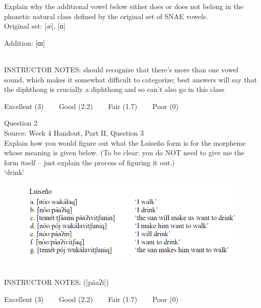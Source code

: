 \documentclass[12pt]{article}
\begin{document}
Explain why the additional vowel below either does or does not belong in the phonetic natural class defined by the original set of SNAE vowels.\\

Original set: {[æ]}, {[ɑ]}

Addition: {[ɑɪ]}


~\\
INSTRUCTOR NOTES: should recognize that there's more than one vowel sound, which makes it somewhat difficult to categorize; best answers will say that the diphthong is crucially a diphthong and so can't also go in this class


\vfill
Excellent (3) ~~~ Good (2.2) ~~~ Fair (1.7) ~~~ Poor (0)
\newpage

{\large Question 2}\\

Source: Week 4 Handout, Part II, Question 3\\

Explain how you would figure out what the Luiseño form is for the morpheme whose meaning is given below. (To be clear: you do NOT need to give me the form itself -- just explain the process of figuring it out.)\\

‘drink’

\begin{figure}[H]
\includegraphics{../images/luiseno.png}
\end{figure}

~\\
INSTRUCTOR NOTES: ([páaʔi])


\vfill
Excellent (3) ~~~ Good (2.2) ~~~ Fair (1.7) ~~~ Poor (0)
\newpage

\begin{center}
\textbf{{\color{red}{\HUGE END OF EXAM}}}\\

\end{center}
\newpage

\begin{center}
\textbf{{\color{blue}{\HUGE START OF EXAM\\}}}

\textbf{{\color{blue}{\HUGE Student ID: 43672\\}}}

\textbf{{\color{blue}{\HUGE 4:50\\}}}

\end{center}
\newpage
\end{document}
